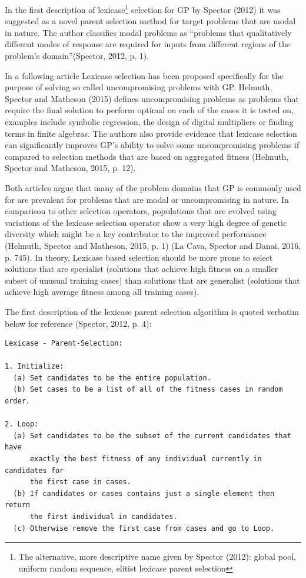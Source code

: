 \documentclass[
  12pt,
]{article}
\begin{document}
In the first description of lexicase\footnote{The alternative, more
  descriptive name given by Spector (2012): global pool, uniform random
  sequence, elitist lexicase parent selection} selection for GP by
Spector (2012) it was suggested as a novel parent selection method for
target problems that are modal in nature. The author classifies modal
problems as ``problems that qualitatively different modes of response
are required for inputs from different regions of the problem's
domain''(Spector, 2012, p. 1).

In a following article Lexicase selection has been proposed specifically
for the purpose of solving so called uncompromising problems with GP.
Helmuth, Spector and Matheson (2015) defines uncompromising problems as
problems that require the final solution to perform optimal on each of
the cases it is tested on, examples include symbolic regression, the
design of digital multipliers or finding terms in finite algebras. The
authors also provide evidence that lexicase selection can significantly
improves GP's ability to solve some uncompromising problems if compared
to selection methods that are based on aggregated fitness (Helmuth,
Spector and Matheson, 2015, p. 12).

Both articles argue that many of the problem domains that GP is commonly
used for are prevalent for problems that are modal or uncompromising in
nature. In comparison to other selection operators, populations that are
evolved using variations of the lexicase selection operator show a very
high degree of genetic diversity which might be a key contributor to the
improved performance (Helmuth, Spector and Matheson, 2015, p. 1) (La
Cava, Spector and Danai, 2016, p. 745). In theory, Lexicase based
selection should be more prone to select solutions that are specialist
(solutions that achieve high fitness on a smaller subset of unusual
training cases) than solutions that are generalist (solutions that
achieve high average fitness among all training cases).

The first description of the lexicase parent selection algorithm is
quoted verbatim below for reference (Spector, 2012, p. 4):

\begin{verbatim}
Lexicase - Parent-Selection:

1. Initialize:
  (a) Set candidates to be the entire population.
  (b) Set cases to be a list of all of the fitness cases in random order.

2. Loop:
  (a) Set candidates to be the subset of the current candidates that have 
      exactly the best fitness of any individual currently in candidates for 
      the first case in cases.
  (b) If candidates or cases contains just a single element then return
      the first individual in candidates.
  (c) Otherwise remove the first case from cases and go to Loop.
\end{verbatim}
\end{document}
